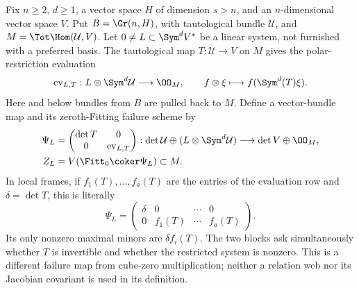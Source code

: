 Fix \(n\ge2\), \(d\ge1\), a vector space \(H\) of dimension
\(s>n\), and an \(n\)-dimensional vector space \(V\).  Put
\(B=\Gr(n,H)\), with tautological bundle \(\mathcal U\), and
\(M=\Tot\Hom(\mathcal U,V)\).  Let
\(0\ne L\subset\Sym^dV^*\) be a linear system, not furnished with
a preferred basis.  The tautological map \(T:\mathcal U\to V\)
on \(M\) gives the polar-restriction evaluation
\[
 \operatorname{ev}_{L,T}:L\otimes\Sym^d\mathcal U\longrightarrow\OO_M,
 \qquad f\otimes\xi\longmapsto f(\Sym^d(T)\xi).
\]
Here and below bundles from \(B\) are pulled back to \(M\).
Define a vector-bundle map and its zeroth-Fitting failure scheme by
\begin{align}
 \Psi_L&=\begin{pmatrix}\det T&0\\0&\operatorname{ev}_{L,T}\end{pmatrix}:
   \det\mathcal U\oplus(L\otimes\Sym^d\mathcal U)
          \longrightarrow\det V\oplus\OO_M,
             \label{eq:polar-fitting-map}\\
 Z_L&=V(\Fitt_0\coker\Psi_L)\subset M.
             \label{eq:polar-fitting-scheme}
\end{align}
In local frames, if \(f_1(T),\ldots,f_a(T)\) are the entries
of the evaluation row and \(\delta=\det T\), this is literally
\[
 \Psi_L=\begin{pmatrix}
    \delta&0&\cdots&0\\
    0&f_1(T)&\cdots&f_a(T)
 \end{pmatrix}.
\]
Its only nonzero maximal minors are \(\delta f_i(T)\).
The two blocks ask simultaneously whether \(T\) is invertible and
whether the restricted system is nonzero.  This is a different
failure map from cube-zero multiplication; neither a relation web nor
its Jacobian covariant is used in its definition.


